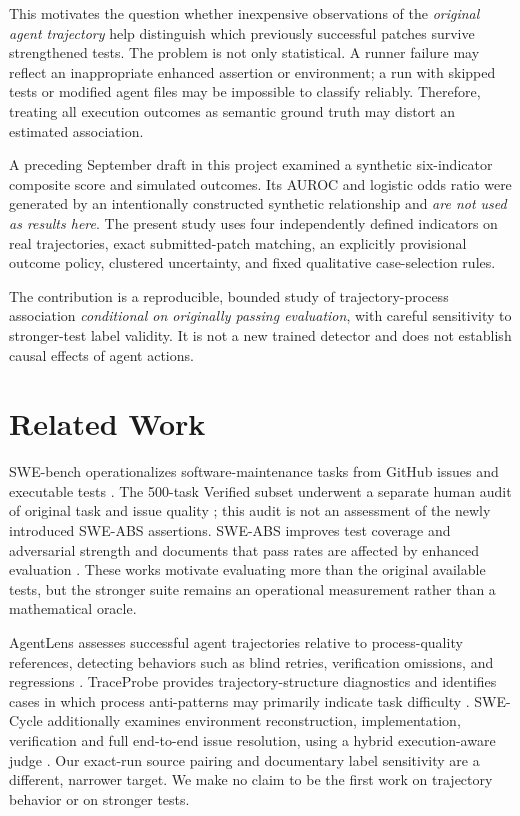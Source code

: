 \documentclass[journal]{IEEEtran}
\begin{document}
This motivates the question whether inexpensive observations of the \emph{original agent trajectory} help distinguish which previously successful patches survive strengthened tests. The problem is not only statistical. A runner failure may reflect an inappropriate enhanced assertion or environment; a run with skipped tests or modified agent files may be impossible to classify reliably. Therefore, treating all execution outcomes as semantic ground truth may distort an estimated association.

A preceding September draft in this project examined a synthetic six-indicator composite score and simulated outcomes. Its AUROC and logistic odds ratio were generated by an intentionally constructed synthetic relationship and \emph{are not used as results here}. The present study uses four independently defined indicators on real trajectories, exact submitted-patch matching, an explicitly provisional outcome policy, clustered uncertainty, and fixed qualitative case-selection rules.

The contribution is a reproducible, bounded study of trajectory-process association \emph{conditional on originally passing evaluation}, with careful sensitivity to stronger-test label validity. It is not a new trained detector and does not establish causal effects of agent actions.

\section{Related Work}
SWE-bench operationalizes software-maintenance tasks from GitHub issues and executable tests \cite{jimenez2024swebench}. The 500-task Verified subset underwent a separate human audit of original task and issue quality \cite{openai2024verified}; this audit is not an assessment of the newly introduced SWE-ABS assertions. SWE-ABS improves test coverage and adversarial strength and documents that pass rates are affected by enhanced evaluation \cite{yu2026sweabs}. These works motivate evaluating more than the original available tests, but the stronger suite remains an operational measurement rather than a mathematical oracle.

AgentLens assesses successful agent trajectories relative to process-quality references, detecting behaviors such as blind retries, verification omissions, and regressions \cite{sahoo2026agentlens}. TraceProbe provides trajectory-structure diagnostics and identifies cases in which process anti-patterns may primarily indicate task difficulty \cite{shu2026traceprobe}. SWE-Cycle additionally examines environment reconstruction, implementation, verification and full end-to-end issue resolution, using a hybrid execution-aware judge \cite{guan2026swecycle}. Our exact-run source pairing and documentary label sensitivity are a different, narrower target. We make no claim to be the first work on trajectory behavior or on stronger tests.
\end{document}
